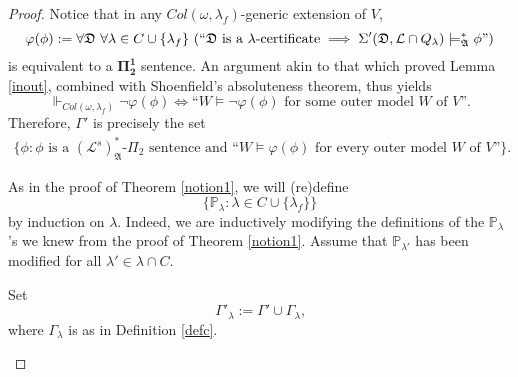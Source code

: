 \documentclass[12pt]{article}
\numberwithin{equation}{section}
\begin{document}
\begin{proof}
Notice that in any $Col(\omega, \lambda_f)$-generic extension of $V$, 
\begin{equation*}
    \varphi(\phi) := \forall \mathfrak{D} \ \forall \lambda \in C \cup \{\lambda_f\} \ (``\mathfrak{D} \text{ is a } \lambda \text{-certificate} \implies \Sigma'(\mathfrak{D}, \mathcal{L} \cap Q_{\lambda}) \models^*_{\mathfrak{A}} \phi")
\end{equation*}
is equivalent to a $\mathbf{\Pi^1_2}$ sentence. An argument akin to that which proved Lemma \ref{inout}, combined with Shoenfield's absoluteness theorem, thus yields 
\begin{equation*}
    \Vdash_{Col(\omega, \lambda_f)} \neg \varphi(\phi) \iff \text{``} W \models \neg \varphi(\phi) \text{ for some outer model } W \text{ of } V \text{''.}
\end{equation*}
Therefore, $\Gamma'$ is precisely the set 
\begin{align*}
    \{\phi : \phi \text{ is a } (\mathcal{L}^s)^*_{\mathfrak{A}}\text{-}\Pi_2 \text{ sentence and ``} W \models \varphi(\phi) \text{ for every outer model } W \text{ of } V \text{''}\} \text{.}
\end{align*}

As in the proof of Theorem \ref{notion1}, we will (re)define $$\{\mathbb{P}_{\lambda} : \lambda \in C \cup \{\lambda_f\}\}$$ by induction on $\lambda$. Indeed, we are inductively modifying the definitions of the $\mathbb{P}_{\lambda}$'s we knew from the proof of Theorem \ref{notion1}. Assume that $\mathbb{P}_{\lambda'}$ has been modified for all $\lambda' \in \lambda \cap C$. 

\begin{defi}\label{def447}
Set
\begin{equation*}
    \Gamma'_{\lambda} := \Gamma' \cup \Gamma_{\lambda} \text{,}
\end{equation*}
where $\Gamma_{\lambda}$ is as in Definition \ref{defc}. 
\end{defi}


\end{proof}
\end{document}
